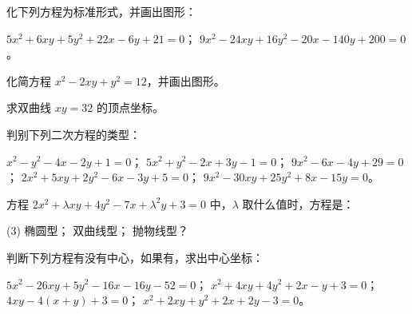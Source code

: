 \begin{Exercise}
  \begin{question}
    \item 化下列方程为标准形式，并画出图形：
    \begin{tasks}
      \task $5x^2+6xy+5y^2+22x-6y+21=0$；
      \task $9x^2-24xy+16y^2-20x-140y+200=0$。
    \end{tasks}
    \item 化简方程 $x^2-2xy+y^2=12$，并画出图形。
    \item 求双曲线 $xy=32$ 的顶点坐标。
    \item 判别下列二次方程的类型：
    \begin{tasks}
      \task $x^2-y^2-4x-2y+1=0$；
      \task $5x^2+y^2-2x+3y-1=0$；
      \task $9x^2-6x-4y+29=0$；
      \task $2x^2+5xy+2y^2-6x-3y+5=0$；
      \task $9x^2-30xy+25y^2+8x-15y=0$。
    \end{tasks}
    \item 方程 $2x^2+\lambda xy+4y^2-7x+\lambda^2y+3=0$ 中，$\lambda$ 取什么值时，方程是：
    \begin{tasks}(3)
      \task 椭圆型；
      \task 双曲线型；
      \task 抛物线型？
    \end{tasks}
    \item 判断下列方程有没有中心，如果有，求出中心坐标：
    \begin{tasks}
      \task $5x^2-26xy+5y^2-16x-16y-52=0$；
      \task $x^2+4xy+4y^2+2x-y+3=0$；
      \task $4xy-4(x+y)+3=0$；
      \task $x^2+2xy+y^2+2x+2y-3=0$。
    \end{tasks}
  \end{question}
\end{Exercise}
